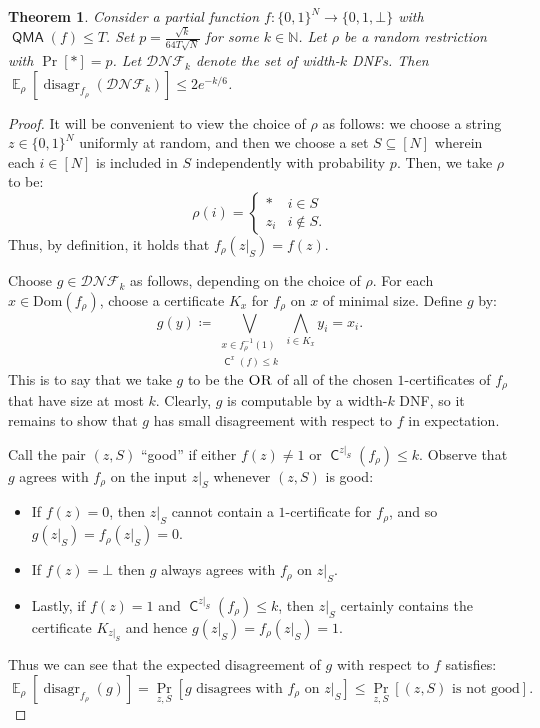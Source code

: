 \documentclass[11pt]{article}%
\newtheorem{theorem}{Theorem}
\newcommand{\E}{\mathop{\mathbb{E}}}
\newcommand{\Naturals}{\mathbb{N}}
\newcommand{\OR}{\normalfont\textsc{OR}}
\newcommand{\Dom}{\mathrm{Dom}}
\DeclareMathOperator{\disagr}{\mathrm{disagr}}
\DeclareMathOperator{\C}{\mathsf{C}}
\DeclareMathOperator{\QMA}{\mathsf{QMA}}
\begin{document}
\begin{theorem}
\label{thm:qma_random_restriction}
Consider a partial function $f: \{0,1\}^N \to \{0,1,\bot\}$ with $\QMA(f) \le T$. Set $p = \frac{\sqrt{k}}{64T\sqrt{N}}$ for some $k \in \Naturals$. Let $\rho$ be a random restriction with $\Pr[*] = p$. Let $\mathcal{DNF}_k$ denote the set of width-$k$ DNFs. Then $\E_\rho \left[\disagr_{f_\rho}\left(\mathcal{DNF}_k\right)\right] \le 2e^{-k/6}$.
\end{theorem}

\begin{proof}
It will be convenient to view the choice of $\rho$ as follows: we choose a string $z \in \{0,1\}^N$ uniformly at random, and then we choose a set $S \subseteq [N]$ wherein each $i \in [N]$ is included in $S$ independently with probability $p$. Then, we take $\rho$ to be:
\[\rho(i) = \begin{cases} * & i \in S\\ z_i & i \not\in S. \end{cases}\]
Thus, by definition, it holds that $f_\rho(z|_S) = f(z)$.

Choose $g \in \mathcal{DNF}_k$ as follows, depending on the choice of $\rho$. For each $x \in \Dom(f_\rho)$, choose a certificate $K_x$ for $f_\rho$ on $x$ of minimal size. Define $g$ by:
\[g(y) \coloneqq \bigvee_{\substack{x \in f_\rho^{-1}(1) \\ \C^x(f) \le k}} \bigwedge_{i \in K_x} y_i = x_i.\]
This is to say that we take $g$ to be the $\OR$ of all of the chosen $1$-certificates of $f_\rho$ that have size at most $k$. Clearly, $g$ is computable by a width-$k$ DNF, so it remains to show that $g$ has small disagreement with respect to $f$ in expectation.

Call the pair $(z, S)$ ``good'' if either $f(z) \neq 1$ or $\C^{z|_S}(f_\rho) \le k$. Observe that $g$ agrees with $f_\rho$ on the input $z|_S$ whenever $(z, S)$ is good:
\begin{itemize}
\item If $f(z) = 0$, then $z|_S$ cannot contain a $1$-certificate for $f_\rho$, and so $g(z|_S) = f_\rho(z|_S) = 0$.
\item If $f(z) = \bot$ then $g$ always agrees with $f_\rho$ on $z|_S$.
\item Lastly, if $f(z) = 1$ and $\C^{z|_S}(f_\rho) \le k$, then $z|_S$ certainly contains the certificate $K_{z|_S}$ and hence $g(z|_S) = f_\rho(z|_S) = 1$.
\end{itemize}

Thus we can see that the expected disagreement of $g$ with respect to $f$ satisfies:
\[\E_\rho \left[\disagr_{f_\rho}(g) \right] = \Pr_{z,S}\left[g \text{ disagrees with } f_\rho \text{ on } z|_S\right] \le \Pr_{z,S}[(z, S) \text{ is not good}].\]


\end{proof}
\end{document}
